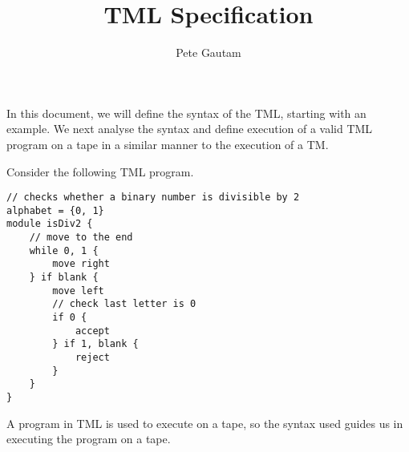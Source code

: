 \documentclass{article}
\title{TML Specification}
\author{Pete Gautam}
\theoremstyle{definition}
\begin{document}
    \maketitle

    In this document, we will define the syntax of the TML, starting with an example. We next analyse the syntax and define execution of a valid TML program on a tape in a similar manner to the execution of a TM.

    Consider the following TML program.
\begin{lstlisting}[language=TML]
// checks whether a binary number is divisible by 2
alphabet = {0, 1}
module isDiv2 {
    // move to the end
    while 0, 1 {
        move right
    } if blank {
        move left
        // check last letter is 0
        if 0 {
            accept
        } if 1, blank {
            reject
        }
    }
}
\end{lstlisting}
    A program in TML is used to execute on a tape, so the syntax used guides us in executing the program on a tape. 
\end{document}
